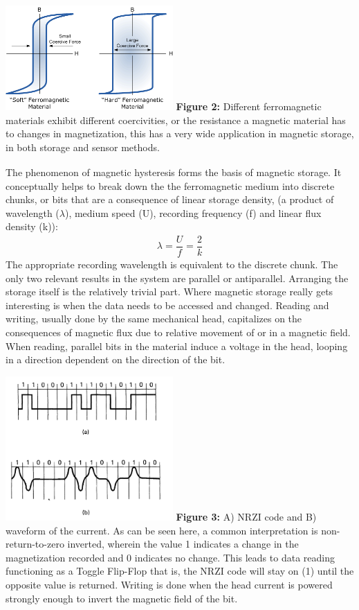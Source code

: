 \documentclass[11pt]{article}
\begin{document}
\begin{multicols}{2}
\begin{center}
	\centering
	\includegraphics[width=0.48\textwidth]{mag_hysterisis.png}
	{\footnotesize\textbf{Figure 2:} Different ferromagnetic materials exhibit different coercivities, or the resistance a magnetic material has to changes in magnetization, this has a very wide application in magnetic storage, in both storage and sensor methods.\textsubscript{\cite{label7}}}
\end{center} 

The phenomenon of magnetic hysteresis forms the basis of magnetic storage. It conceptually helps to break down the the ferromagnetic medium into discrete chunks, or bits that are a consequence of linear storage density, (a product of wavelength ($\lambda$), medium speed (U), recording frequency (f) and linear flux density (k)):
\begin{align*}
	\lambda= \dfrac{U}{f} = \dfrac{2}{k}
\end{align*}
The appropriate recording wavelength is equivalent to the discrete chunk. The only two relevant results in the system are parallel or antiparallel. Arranging the storage itself is the relatively trivial part. Where magnetic storage really gets interesting is when the data needs to be accessed and changed. Reading and writing, usually done by the same mechanical head, capitalizes on the consequences of magnetic flux due to relative movement of or in a magnetic field. When reading, parallel bits in the material induce a voltage in the head, looping in a direction dependent on the direction of the bit. 
\begin{center}
	\centering
	\includegraphics[width=0.48\textwidth]{Waveform_code.png}
	{\footnotesize\textbf{Figure 3:}  A) NRZI code and B) waveform of the current. As can be seen here, a common interpretation is non-return-to-zero inverted, wherein the value 1 indicates a change in the magnetization recorded and 0 indicates no change. This leads to data reading functioning as a Toggle Flip-Flop that is, the NRZI code will stay on (1) until the opposite value is returned. Writing is done when the head current is powered strongly enough to invert the magnetic field of the bit\textsubscript{\cite{label1}}}.
\end{center} 





\end{multicols}
\end{document}
